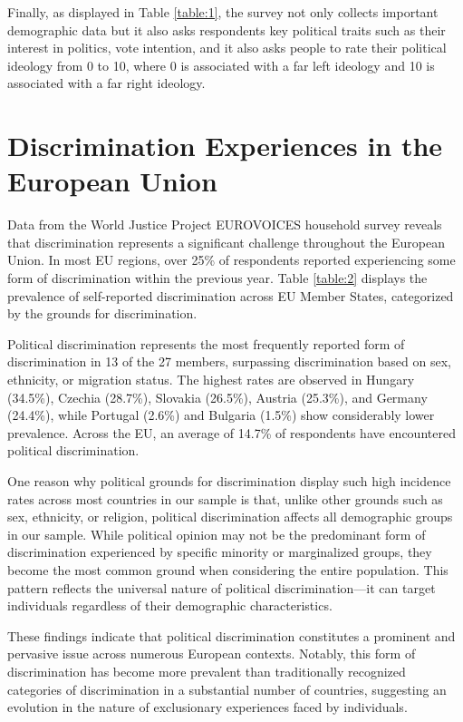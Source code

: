\documentclass{article}
\begin{document}
Finally, as displayed in Table \ref{table:1}, the survey not only collects important demographic data but it also asks respondents key political traits such as their interest in politics, vote intention, and it also asks people to rate their political ideology from 0 to 10, where 0 is associated with a far left ideology and 10 is associated with a far right ideology.

\section{Discrimination Experiences in the European Union}

Data from the World Justice Project EUROVOICES household survey reveals that discrimination represents a significant challenge throughout the European Union. In most EU regions, over 25\% of respondents reported experiencing some form of discrimination within the previous year. Table \ref{table:2} displays the prevalence of self-reported discrimination across EU Member States, categorized by the grounds for discrimination.

Political discrimination represents the most frequently reported form of discrimination in 13 of the 27 members, surpassing discrimination based on sex, ethnicity, or migration status. The highest rates are observed in Hungary (34.5\%), Czechia (28.7\%), Slovakia (26.5\%), Austria (25.3\%), and Germany (24.4\%), while Portugal (2.6\%) and Bulgaria (1.5\%) show considerably lower prevalence. Across the EU, an average of 14.7\% of respondents have encountered political discrimination.

One reason why political grounds for discrimination display such high incidence rates across most countries in our sample is that, unlike other grounds such as sex, ethnicity, or religion, political discrimination affects all demographic groups in our sample. While political opinion may not be the predominant form of discrimination experienced by specific minority or marginalized groups, they become the most common ground when considering the entire population. This pattern reflects the universal nature of political discrimination—it can target individuals regardless of their demographic characteristics.

These findings indicate that political discrimination constitutes a prominent and pervasive issue across numerous European contexts. Notably, this form of discrimination has become more prevalent than traditionally recognized categories of discrimination in a substantial number of countries, suggesting an evolution in the nature of exclusionary experiences faced by individuals.
\end{document}
